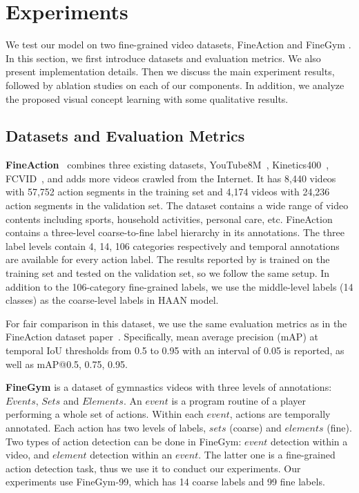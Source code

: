 \section{Experiments}






We test our model on two fine-grained video datasets, FineAction \cite{liu2021fineaction} and FineGym \cite{shao2020finegym}. In this section, we first introduce datasets and evaluation metrics. We also present implementation details. Then we discuss the main experiment results, followed by ablation studies on each of our components. In addition, we analyze the proposed visual concept learning with some qualitative results. 

\subsection{Datasets and Evaluation Metrics}

\textbf{FineAction}~\cite{liu2021fineaction} combines three existing datasets, YouTube8M~\cite{abu2016youtube}, Kinetics400~\cite{carreira2017quo}, FCVID~\cite{jiangfcvid}, and adds more videos crawled from the Internet. It has 8,440 videos with 57,752 action segments in the training set and 4,174 videos with 24,236 action segments in the validation set. The dataset contains a wide range of video contents including sports, household activities, personal care, etc. FineAction contains a three-level coarse-to-fine label hierarchy in its annotations. The three label levels contain 4, 14, 106 categories respectively and temporal annotations are available for every action label. The results reported by \cite{liu2021fineaction} is trained on the training set and tested on the validation set, so we follow the same setup. In addition to the 106-category fine-grained labels, we use the middle-level labels (14 classes) as the coarse-level labels in HAAN model.

For fair comparison in this dataset, we use the same evaluation metrics as in the FineAction dataset paper~\cite{liu2021fineaction}. Specifically, mean average precision (mAP) at temporal IoU thresholds from 0.5 to 0.95 with an interval of 0.05 is reported, as well as mAP@{0.5, 0.75, 0.95}.

\textbf{FineGym} \cite{shao2020finegym} is a dataset of gymnastics videos with three levels of annotations: $Events$, $Sets$ and $Elements$. An $event$ is a program routine of a player performing a whole set of actions. Within each $event$, actions are temporally annotated. Each action has two levels of labels, $sets$ (coarse) and $elements$ (fine). Two types of action detection can be done in FineGym: $event$ detection within a video, and $element$ detection within an $event$. The latter one is a fine-grained action detection task, thus we use it to conduct our experiments. Our experiments use FineGym-99, which has 14 coarse labels and 99 fine labels. 


